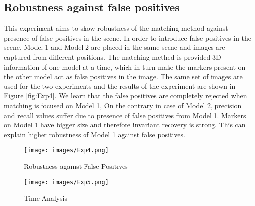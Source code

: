\documentclass{bmvc2k}
\begin{document}
\subsection{Robustness against false positives}
This experiment aims to show robustness of the matching method against presence of false positives in the scene. 
In order to introduce false positives in the scene, Model 1 and Model 2 are placed in the same scene and images are captured from different positions. 
The matching method is provided 3D information of one model at a time, which in turn make the markers present on the other model act as false positives in the image. 
The same set of images are used for the two experiments and the results of the experiment are shown in Figure \ref{fig:Exp4}.
We learn that the false positives are completely rejected when matching is focused on Model 1, On the contrary in case of Model 2, precision and recall values suffer due to presence of false positives from Model 1. 
Markers on Model 1 have bigger size and therefore invariant recovery is strong. This can explain higher robustness of Model 1 against false positives. 


\begin{figure}[tb]
\begin{minipage}{0.5\textwidth}
\centering
 \texttt{[image: images/Exp4.png]}
 \caption{Robustness against False Positives}
  \label{fig:Exp4}
\end{minipage}
\begin{minipage}{0.5\textwidth}
\centering
  \texttt{[image: images/Exp5.png]} 
 \caption{Time Analysis}
 \label{fig:Exp5}
\end{minipage}
\end{figure}
\end{document}
